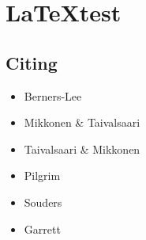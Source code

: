\chapter{\LaTeX test}

\section{Citing}

\begin{itemize}
\item Berners-Lee \cite{berners2010long}
\item Mikkonen \& Taivalsaari \cite{mikkonen2011apps}
\item Taivalsaari \& Mikkonen \cite{taivalsaari2011web}
\item Pilgrim \cite{pilgrim2010html5}
\item Souders \cite{souders2007high}
\item Garrett \cite{garrett2005ajax}
\end{itemize}
